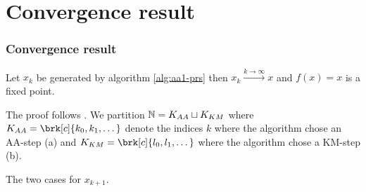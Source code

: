 \SetAlFnt{\normalsize}

\section{Convergence result}

\begin{frame}
	\frametitle{Convergence result}
	\begin{theorem}[Convergence]
		Let $x_k$ be generated by algorithm \ref{alg:aa1-prs} then $x_k\xrightarrow{k\to\infty}x$ and $f(x)=x$ is a fixed point.
	\end{theorem}
\end{frame}

%	 

\begin{frame}
	\centering
	\scalebox{0.9}{
	
	}
\end{frame}

\begin{frame}
	\begin{proofs}
	The proof follows \cite[Theorem 6]{ZhaAA}.
	We partition $\mathbb{N}=K_{AA}\sqcup K_{KM}$ where $K_{AA}=\brk[c]{k_0,k_1,\dots}$ denote the indices $k$ where the algorithm chose an AA-step (a) and $K_{KM}=\brk[c]{l_0,l_1,\dots}$ where the algorithm chose a KM-step (b).
	
	\begin{center}
	\begin{algorithm}[H]
	\caption{The two cases for $x_{k+1}$.}
	\end{algorithm}
	\end{center}
	\end{proofs}
\end{frame}


